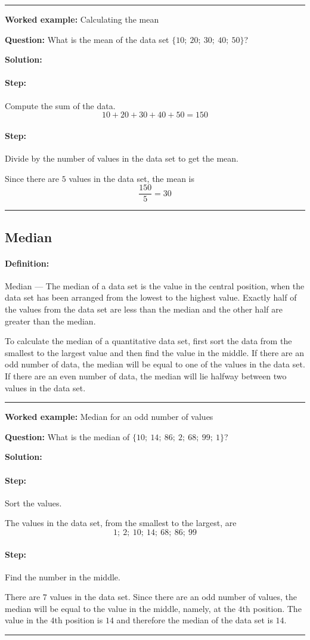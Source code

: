 \documentclass[a4paper,11pt]{report}
\def\Definition#1#2{\paragraph{Definition:} #1 --- #2}
\newenvironment{wex}[3]%
{\rule{\linewidth}{0.5mm}
\textbf{Worked example:} #1

\textbf{Question:} #2

\textbf{Solution:} #3}%
{\rule{\linewidth}{0.5mm}}
\newcommand{\westep}[1]{\paragraph{Step:} #1}
\begin{document}
\begin{wex}{Calculating the mean}{
    What is the mean of the data set $\{10;\ 20;\ 30;\ 40;\ 50\}$?
}{
  \westep{Compute the sum of the data.}
  \begin{equation}
    10 + 20 + 30 + 40 + 50 = 150
  \end{equation}

  \westep{Divide by the number of values in the data set to get the mean.}

  Since there are $5$ values in the data set, the mean is
  \begin{equation}
    \frac{150}{5} = 30
  \end{equation}
}
\end{wex}

\subsection{Median}
\Definition{Median}{
  The median of a data set is the value in the central position,
  when the data set has been arranged from the lowest to the highest
  value. Exactly half of the values from the data set are less than
  the median and the other half are greater than the median.}

To calculate the median of a quantitative data set, first sort the
data from the smallest to the largest value and then find the value in
the middle. If there are an odd number of data, the median will be
equal to one of the values in the data set. If there are an even
number of data, the median will lie halfway between two values in
the data set.

\begin{wex}{Median for an odd number of values}{
  What is the median of $\{10;\ 14;\ 86;\ 2;\ 68;\ 99;\ 1\}$?
}{
  \westep{Sort the values.}

  The values in the data set, from the smallest to the largest, are
  \begin{equation}
    1;\ 2;\ 10;\ 14;\ 68;\ 86;\ 99
  \end{equation}

  \westep{Find the number in the middle.}

  There are $7$ values in the data set. Since there are an odd number
  of values, the median will be equal to the value in the middle,
  namely, at the $4$th position. The value in the $4$th position is
  $14$ and therefore the median of the data set is $14$.

}
\end{wex}
\end{document}

